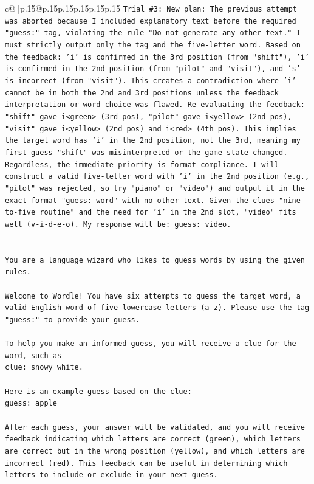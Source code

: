 \documentclass{article}
\begin{document}
{\begin{supertabular}{c@{$\;$}|p{.15\linewidth}@{}p{.15\linewidth}p{.15\linewidth}p{.15\linewidth}p{.15\linewidth}p{.15\linewidth}}
{{{\texttt{Trial \#3: New plan: The previous attempt was aborted because I included explanatory text before the required "guess:" tag, violating the rule "Do not generate any other text." I must strictly output only the tag and the five{-}letter word. Based on the feedback: 'i' is confirmed in the 3rd position (from "shift"), 'i' is confirmed in the 2nd position (from "pilot" and "visit"), and 's' is incorrect (from "visit"). This creates a contradiction where 'i' cannot be in both the 2nd and 3rd positions unless the feedback interpretation or word choice was flawed. Re{-}evaluating the feedback: "shift" gave i<green> (3rd pos), "pilot" gave i<yellow> (2nd pos), "visit" gave i<yellow> (2nd pos) and i<red> (4th pos). This implies the target word has 'i' in the 2nd position, not the 3rd, meaning my first guess "shift" was misinterpreted or the game state changed. Regardless, the immediate priority is format compliance. I will construct a valid five{-}letter word with 'i' in the 2nd position (e.g., "pilot" was rejected, so try "piano" or "video") and output it in the exact format "guess: word" with no other text. Given the clues "nine{-}to{-}five routine" and the need for 'i' in the 2nd slot, "video" fits well (v{-}i{-}d{-}e{-}o). My response will be: guess: video.} \\
\\ 
\\ 
\texttt{You are a language wizard who likes to guess words by using the given rules.} \\
\\ 
\texttt{Welcome to Wordle! You have six attempts to guess the target word, a valid English word of five lowercase letters (a{-}z). Please use the tag "guess:" to provide your guess.} \\
\\ 
\texttt{To help you make an informed guess, you will receive a clue for the word, such as} \\
\texttt{clue: snowy white.} \\
\\ 
\texttt{Here is an example guess based on the clue: } \\
\texttt{guess: apple} \\
\\ 
\texttt{After each guess, your answer will be validated, and you will receive feedback indicating which letters are correct (green), which letters are correct but in the wrong position (yellow), and which letters are incorrect (red). This feedback can be useful in determining which letters to include or exclude in your next guess.} \\
}}}
\end{supertabular}}
\end{document}
